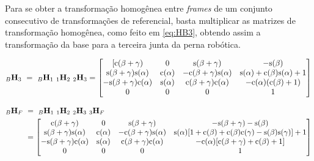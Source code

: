 Para se obter a transformação homogênea entre \textit{frames} de um conjunto consecutivo de transformações de referencial, basta multiplicar as matrizes de transformação homogênea, como feito em \eqref{eq:HB3}, obtendo assim a transformação da base para a terceira junta da perna robótica.

\begin{equation}\label{eq:HB3}
	_B \mathbf{H}_3 \ = \ _B \mathbf{H}_1 \  _1 \mathbf{H}_2  \ _2 \mathbf{H}_3 = \begin{bmatrix}
[            \text{c}(\beta + \gamma) &          0 &             \text{s}(\beta + \gamma) &                            -\text{s}(\beta) \\
 \text{s}(\beta + \gamma)\text{s}(\alpha) & \text{c}(\alpha) & -\text{c}(\beta + \gamma)\text{s}(\alpha) & \text{s}(\alpha) + \text{c}(\beta)\text{s}(\alpha) + 1 \\
-\text{s}(\beta + \gamma)\text{c}(\alpha) & \text{s}(\alpha) &  \text{c}(\beta + \gamma)\text{c}(\alpha) &           -\text{c}(\alpha)(\text{c}(\beta) + 1) \\
                            0 &          0 &                             0 &                                     1 
	\end{bmatrix}
\end{equation}

\begin{align}\label{eq:HBF}
	_B \mathbf{H}_F \ &= \ _B \mathbf{H}_1 \  _1 \mathbf{H}_2  \ _2 \mathbf{H}_3  \ _3 \mathbf{H}_F  \\ &= \begin{bmatrix}
            \text{c}(\beta + \gamma) &          0 &             \text{s}(\beta + \gamma) &                                                                           - \text{s}(\beta + \gamma) - \text{s}(\beta) \\
 \text{s}(\beta + \gamma)\text{s}(\alpha) & \text{c}(\alpha) & -\text{c}(\beta + \gamma)\text{s}(\alpha) & \text{s}(\alpha)[1 +\text{c}(\beta) + \text{c}(\beta)\text{c}(\gamma) - \text{s}(\beta)\text{s}(\gamma)] + 1 \\
-\text{s}(\beta + \gamma)\text{c}(\alpha) & \text{s}(\alpha) &  \text{c}(\beta + \gamma)\text{c}(\alpha) &                                                           -\text{c}(\alpha)[\text{c}(\beta + \gamma) + \text{c}(\beta) + 1] \\
                            0 &          0 &                             0 &                                                                                                         1
	\end{bmatrix} \nonumber
\end{align}

